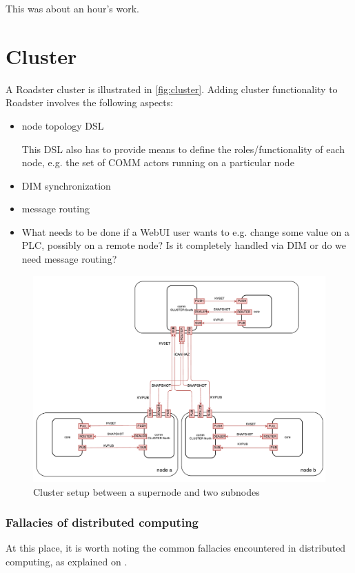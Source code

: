 This was about an hour's work.

\section{Cluster}\label{sec:approach:cluster}
A Roadster cluster is illustrated in \autoref{fig:cluster}. Adding cluster
functionality to Roadster involves the following aspects:
\begin{itemize}
	\item node topology DSL

		This DSL also has to provide means to define the roles/functionality of each node, e.g. the set of COMM actors running on a particular node

	\item DIM synchronization
	\item message routing
	\item What needs to be done if a WebUI user wants to e.g. change some value on a PLC, possibly on a remote node? Is it completely handled via DIM or do we need message routing?
\end{itemize}

\begin{figure}[]
	\includegraphics[width=\textwidth]{img/cluster_protocol.pdf}
	\caption{Cluster setup between a supernode and two subnodes}
	\label{fig:cluster}
\end{figure}

\subsubsection{Fallacies of distributed computing}
At this place, it is worth noting the common fallacies encountered in
distributed computing, as explained on \cite{dcomp:fallacies}.

